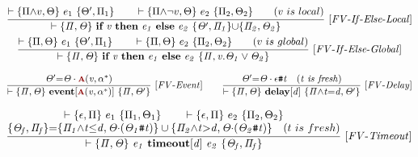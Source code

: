 \documentclass[acmsmall,10pt,review]{acmart}
\newcommand{\anyevent}[1]{{\textcolor{darkred}
{{\textbf{\footnotesize #1}}}}}
\newcommand{\code}[1]{{\tt{\ensuremath{\m{#1}}}}}
\newcommand{\m}{\mathit}
\newcommand{\mysharp}{{\mathrel{\texttt{\#}}}}
\begin{document}
{{{\small\begin{gather*}
  \code{\frac{ 
    \begin{matrix}
\vdash \{ \Pi{\wedge} v, \Theta    \} \ e_1 \ \{  \Theta^{\prime} , \Pi_1 \} 
\qquad 
\vdash \{ \Pi{\wedge} \neg v , \Theta  \} \ e_2 \ 
\{  \Pi_2, \Theta_2 \}  
\qquad (v\ is\ local)
\end{matrix}}
  {\vdash \s{ \Pi, \Theta}\  \textbf{if}\ v\ \textbf{then}\ e_1\ 
  \textbf{else}\ e_2 \ \s{ \Theta^{\prime} , \Pi_1} {\cup} \s{\Pi_2, \Theta_2} } \  
  {[FV\text{-}If\text{-}Else\text{-}Local]}} 
\\
\code{\frac{ 
  \begin{matrix}
\vdash \{ \Pi, \Theta    \} \ e_1 \ \{  \Theta^{\prime} , \Pi_1 \} 
\qquad 
\vdash \{ \Pi , \Theta  \} \ e_2 \ 
\{  \Pi_2, \Theta_2 \}  
\qquad (v\ is\ global)
\end{matrix}}
{\vdash \s{ \Pi, \Theta}\  \textbf{if}\ v\ \textbf{then}\ e_1\ 
\textbf{else}\ e_2 \ \s{\Pi, v. \Theta_1 \vee \Theta_2 }} \  
{[FV\text{-}If\text{-}Else\text{-}Global]}} 
  \end{gather*}}}
  
     

  {{\small\begin{gather*}
  \code{\frac{
    \Theta^\prime {=} \Theta\cdot \anyevent{A}(v, \alpha^*) 
    }
  {\vdash \s{ \Pi, \Theta} \  
  \textbf{event} [\anyevent{A}(v, \alpha^*)] 
   \ \{\Pi, \Theta^\prime \}} \   {[FV\text{-}Event]}} 
   \qquad
  \code{\frac{
    \Theta^\prime {=} \Theta\cdot \epsilon\mysharp t \quad (t\ is\ fresh) 
    }
  {\vdash \s{ \Pi, \Theta} \  
  \textbf{delay} [d] 
   \ \{ \Pi{\wedge} t {=}d,  \Theta^\prime \}} \   {[FV\text{-}Delay]}} 
\end{gather*}}}
     

{{\small\begin{gather*}
  \code{\frac{
    \begin{matrix}
      \vdash \{ \epsilon, \Pi \}\ e_1 \ \{  \Pi_1, \Theta_1\} 
      \qquad 
      \vdash \{  \epsilon, \Pi \}\ e_2 \ \{  \Pi_2, \Theta_2 \} 
      \\
      \s{\Theta_f, \Pi_f} {=} \s{\Pi_1 {\wedge}t{\leq}d, \Theta {\cdot}(\Theta_1\mysharp t)}
      \cup 
  \s{\Pi_2 {\wedge}t{>}d, \Theta {\cdot}(\Theta_2\mysharp t)}   
  \quad (t\ is\ fresh)     
\end{matrix}
  }
  {\vdash \s{ \Pi, \Theta} \  
  e_1\ \textbf{timeout} [d] \  e_2
   \ \s{\Theta_f, \Pi_f} } \   {[FV\text{-}Timeout]}} 
\end{gather*}}}

}
\end{document}
